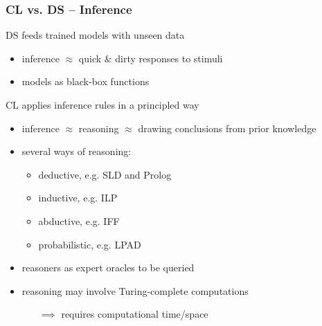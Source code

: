 \documentclass[presentation]{beamer}\mode<presentation>{\usetheme{AMSBolognaFC}}
\begin{document}
\begin{frame}%
    \frametitle{CL vs. DS -- Inference}

    \begin{block}{DS feeds trained models with unseen data}
        \begin{itemize}
            \item \alert{inference} $\approx$ quick \& dirty responses to stimuli
            \item models as black-box functions
        \end{itemize}
    \end{block}

    \begin{block}{CL applies inference rules in a principled way}
        \begin{itemize}
            \item \alert{inference} $\approx$ reasoning $\approx$ drawing conclusions from prior knowledge 
            \item several ways of reasoning:
            \begin{itemize}
                \item deductive, e.g. SLD and Prolog
                \item inductive, e.g. ILP
                \item abductive, e.g. IFF
                \item probabilistic, e.g. LPAD 
            \end{itemize}
            \item reasoners as expert \alert{oracles} to be queried 
            \item reasoning may involve \alert{Turing-complete} computations
            \begin{itemize}
                \item[$\implies$] requires computational \alert{time/space}
            \end{itemize}
        \end{itemize}
    \end{block}
\end{frame}
\end{document}
